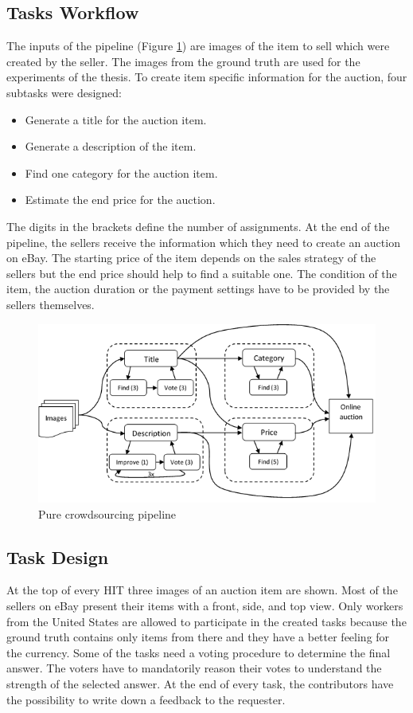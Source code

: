 \subsection{Tasks Workflow}
The inputs of the pipeline (Figure \ref{purePipeline}) are images of the item to sell which were created by the seller. The images from the ground truth are used for the experiments of the thesis. To create item specific information for the auction, four subtasks were designed: 
\begin{itemize}
	\item Generate a title for the auction item.
	\item Generate a description of the item.
	\item Find one category for the auction item.
	\item Estimate the end price for the auction. 
\end{itemize}
The digits in the brackets define the number of assignments. At the end of the pipeline, the sellers receive the information which they need to create an auction on eBay. The starting price of the item depends on the sales strategy of the sellers but the end price should help to find a suitable one. The condition of the item, the auction duration or the payment settings have to be provided by the sellers themselves.
\begin{figure}[h!]
\centering
\includegraphics[scale=0.8]{images/pipelines/Pure_Pipeline.png}
\caption{Pure crowdsourcing pipeline}
\label{purePipeline}
\end{figure}

\subsection{Task Design}
At the top of every HIT three images of an auction item are shown. Most of the sellers on eBay present their items with a front, side, and top view. Only workers from the United States are allowed to participate in the created tasks because the ground truth contains only items from there and they have a better feeling for the currency. Some of the tasks need a voting procedure to determine the final answer. The voters have to mandatorily reason their votes to understand the strength of the selected answer. At the end of every task, the contributors have the possibility to write down a feedback to the requester.

